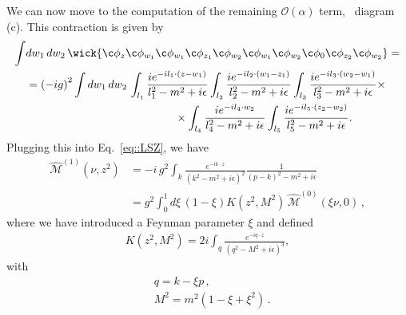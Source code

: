 We can now move to the computation of the remaining
$\mathcal{O}\left(\alpha\right)$ term, \ie\ diagram (c). This contraction is
given by
\begin{align}
\int &dw_1\, dw_2\,\wick{\c \phi_z \c \phi_{w_1} \c \phi_{w_1} \c \phi_{z_1} \c \phi_{w_2} \c \phi_{w_1} \c \phi_{w_2} \c \phi_{0} \c \phi_{z_2} \c \phi_{w_2} } = \nonumber\\
&=\left(-ig\right)^2
\int dw_1\,dw_2\,
\int_{l_1} \frac{ie^{-il_1 \cdot \left(z-w_1\right)}}{l_1^2-m^2 + i\epsilon}
\int_{l_2} \frac{ie^{-il_2 \cdot \left(w_1-z_1\right)}}{l_2^2-m^2 + i\epsilon}
\int_{l_3} \frac{ie^{-il_3 \cdot \left(w_2-w_1\right)}}{l_3^2-m^2 + i\epsilon} 
\times \nonumber\\
&\,\,\,\,\,\,\,\,\,\,\,\,\,\,\,\,\,\,\,\,\,\,\,\,\,\,\,\,\,\,\,\,\,\,\,\,\,\,\,\,\,\,\,\,\,\,\,\,\,\,\,\,\,\,\,\,\,\,\,\,\,\,\,\,\,\,\,\,\,\,\,\,\,\,\,\,\,\,\,\, \times
\int_{l_4} \frac{ie^{-il_4 \cdot w_2}}{l_4^2-m^2 + i\epsilon} 
\int_{l_5} \frac{ie^{-il_5 \cdot \left(z_2-w_2\right)}}{l_5^2-m^2 + i\epsilon}.
\end{align}
Plugging this into Eq.~\eqref{eq::LSZ}, we have
\begin{align}
        \label{eq::M1}
        \widehat{\mathcal{M}}^{(1)}\left(\nu, z^2\right) 
        &= -i \,g^2 \int_k 
        \frac{e^{-i k\cdot z}}{\left(k^2-m^2 + i\epsilon\right)^2}
        \frac{1}{\left(p-k\right)^2-m^2 + i\epsilon} \nonumber \\
        & = g^2 \int_0^1 d\xi\,
        \left(1-\xi\right) K\left(z^2, M^2\right)\, 
        \widehat{\mathcal{M}}^{(0)}\left(\xi\nu, 0\right)\, , 
\end{align}
where we have introduced a Feynman parameter $\xi$ and defined 
\begin{align}
\label{eq::kerneldef}
        K\left(z^2, M^2\right) = 2i\int_q
        \frac{e^{-i q\cdot z}}{\left(q^2-M^2 + i\epsilon\right)^3},
\end{align}
with
\begin{align}
& q = k-\xi p\, , \\
& M^2 = m^2\left(1-\xi+\xi^2\right)\, .
\end{align}


